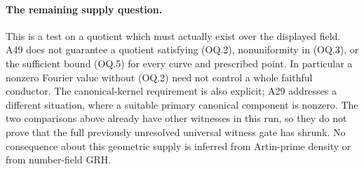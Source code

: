 \paragraph{The remaining supply question.}
This is a test on a quotient which must actually exist over the
displayed field. A49 does not guarantee a quotient satisfying
(OQ.2), nonuniformity in (OQ.3), or the sufficient bound (OQ.5)
for every curve and prescribed point. In particular a nonzero
Fourier value without (OQ.2) need not control a whole faithful
conductor. The canonical-kernel requirement is also explicit;
A29 addresses a different situation, where a suitable primary
canonical component is nonzero. The two comparisons above
already have other witnesses in this run, so they do not prove
that the full previously unresolved universal witness gate has
shrunk. No consequence about this geometric supply is inferred
from Artin-prime density or from number-field GRH.

